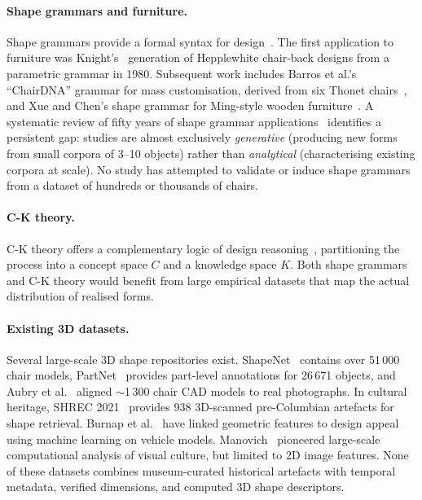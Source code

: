 \paragraph{Shape grammars and furniture.}
Shape grammars provide a formal syntax for design~\cite{stiny1972shape,stiny1980introduction,stiny2006shape,stiny1991algebras}.
The first application to furniture was Knight's~\cite{knight1980hepplewhite} generation
of Hepplewhite chair-back designs from a parametric grammar in 1980.
Subsequent work includes Barros et al.'s ``ChairDNA'' grammar
for mass customisation, derived from six Thonet chairs~\cite{barros2016chair},
and Xue and Chen's shape grammar for Ming-style wooden furniture~\cite{xuechen2024shape}.
A systematic review of fifty years of shape grammar applications~\cite{haakonsen2023shapegrammar}
identifies a persistent gap: studies are almost exclusively \emph{generative}
(producing new forms from small corpora of 3--10 objects)
rather than \emph{analytical} (characterising existing corpora at scale).
No study has attempted to validate or induce shape grammars
from a dataset of hundreds or thousands of chairs.

\paragraph{C-K theory.}
C-K theory offers a complementary logic of design reasoning~\cite{hatchuel2003new,hatchuel2009ck},
partitioning the process into a concept space $C$ and a knowledge space $K$.
Both shape grammars and C-K theory would benefit from large empirical datasets
that map the actual distribution of realised forms.

\paragraph{Existing 3D datasets.}
Several large-scale 3D shape repositories exist.
ShapeNet~\cite{chang2015shapenet} contains over 51\,000 chair models,
PartNet~\cite{mo2019partnet} provides part-level annotations for 26\,671 objects,
and Aubry et al.~\cite{aubry2014chairs} aligned $\sim$1\,300 chair CAD models
to real photographs.
In cultural heritage, SHREC 2021~\cite{sipiran2021shrec} provides
938 3D-scanned pre-Columbian artefacts for shape retrieval.
Burnap et al.~\cite{burnap2023aesthetic} have linked geometric features
to design appeal using machine learning on vehicle models.
Manovich~\cite{manovich2020cultural} pioneered large-scale computational analysis
of visual culture, but limited to 2D image features.
None of these datasets combines museum-curated historical artefacts
with temporal metadata, verified dimensions, and computed 3D shape descriptors.

